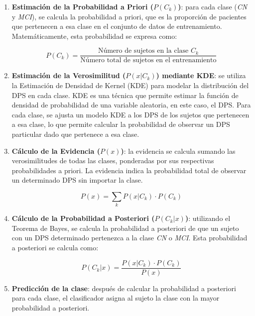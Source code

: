 \begin{enumerate}
	\item \textbf{Estimación de la Probabilidad a Priori ($P(C_k)$)}:
	para cada clase (\textit{CN} y \textit{MCI}), se calcula la probabilidad a priori, que es la proporción de pacientes que pertenecen a esa clase en el conjunto de datos de entrenamiento. Matemáticamente, esta probabilidad se expresa como:

	\begin{equation}
		P(C_k) = \frac{\text{Número de sujetos en la clase } 	C_k}{\text{Número total de sujetos en el entrenamiento}}
	\end{equation}

	\item \textbf{Estimación de la Verosimilitud ($P(x | C_k)$) mediante KDE}: 
	se utiliza la Estimación de Densidad de Kernel (KDE) para modelar la distribución del DPS en cada clase. KDE es una técnica que permite estimar la función de densidad de probabilidad de una variable aleatoria, en este caso, el DPS. Para cada clase, se ajusta un modelo KDE a los DPS de los sujetos que pertenecen a esa clase, lo que permite calcular la probabilidad de observar un DPS particular dado que pertenece a esa clase.

	\item \textbf{Cálculo de la Evidencia ($P(x)$)}: 
	la evidencia se calcula sumando las verosimilitudes de todas las clases, ponderadas por sus respectivas probabilidades a priori. La evidencia indica la probabilidad total de observar un determinado DPS sin importar la clase.

	\begin{equation}
		P(x) = \sum_{k} P(x | C_k) \cdot P(C_k)
	\end{equation}

	\item \textbf{Cálculo de la Probabilidad a Posteriori ($P(C_k | x)$)}: 
	utilizando el Teorema de Bayes, se calcula la probabilidad a posteriori de que un sujeto con un DPS determinado pertenezca a la clase \textit{CN} o \textit{MCI}. Esta probabilidad a posteriori se calcula como:

	\begin{equation}
		P(C_k | x) = \frac{P(x | C_k) \cdot P(C_k)}{P(x)}
	\end{equation}

	\item \textbf{Predicción de la clase}:
	después de calcular la probabilidad a posteriori para cada clase, el clasificador asigna al sujeto la clase con la mayor probabilidad a posteriori.
\end{enumerate}

